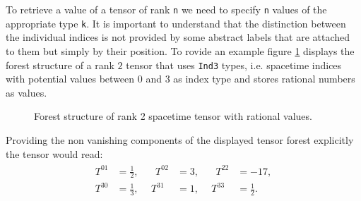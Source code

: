 \documentclass[a4paper,12pt, DIV=14, BCOR=5mm, twoside, headsepline, numbers=noenddot]{scrbook}
\begin{document}
To retrieve a value of a tensor of rank \texttt{n} we need to specify \texttt{n} values of the appropriate type \texttt{k}. It is important to understand that the distinction between the individual indices is not provided by some abstract labels that are attached to them but simply by their position. To rovide an example figure \ref{ExampleTens} displays the forest structure of a rank $2$ tensor that uses \texttt{Ind3} types, i.e. spacetime indices with potential values between $0$ and $3$ as index type and stores rational numbers as values.
\begin{figure}[hbt!]
\centering
{}
\caption{Forest structure of rank 2 spacetime tensor with rational values.}\label{ExampleTens}
\end{figure}
Providing the non vanishing components of the displayed tensor forest explicitly the tensor would read:
\begin{align}
\begin{alignedat}{3}
T^{01} &= \frac{1}{2}, \ \  &  \ \ T^{02} &= 3, \ \  & \ \ T^{22} &= -17,\\
T^{30} &= \frac{1}{3}, & T^{31} &= 1, & T^{33} &= \frac{1}{2}.
\end{alignedat}
\end{align}
\end{document}
